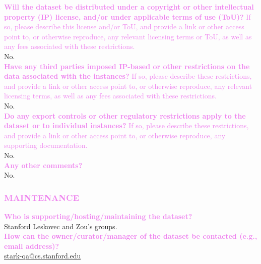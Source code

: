\documentclass{article}
\newcommand{\sectioncolor}{Violet}
\begin{document}
    \textcolor{\sectioncolor}{\textbf{
    Will the dataset be distributed under a copyright or other intellectual
    property (IP) license, and/or under applicable terms of use (ToU)?
    }
    If so, please describe this license and/or ToU, and provide a link or other
    access point to, or otherwise reproduce, any relevant licensing terms or
    ToU, as well as any fees associated with these restrictions.
    } \\
    No. \\

    \textcolor{\sectioncolor}{\textbf{
    Have any third parties imposed IP-based or other restrictions on the data
    associated with the instances?
    }
    If so, please describe these restrictions, and provide a link or other
    access point to, or otherwise reproduce, any relevant licensing terms, as
    well as any fees associated with these restrictions.
    } \\
    No.\\

    \textcolor{\sectioncolor}{\textbf{
    Do any export controls or other regulatory restrictions apply to the
    dataset or to individual instances?
    }
    If so, please describe these restrictions, and provide a link or other
    access point to, or otherwise reproduce, any supporting documentation.
    } \\
    No. \\

    \textcolor{\sectioncolor}{\textbf{
    Any other comments?
    }} \\
    No. \\

\begin{mdframed}[linecolor=\sectioncolor]
\subsubsection*{\textcolor{\sectioncolor}{
    MAINTENANCE
}}
\end{mdframed}

    \textcolor{\sectioncolor}{\textbf{
    Who is supporting/hosting/maintaining the dataset?
    }
    } \\
    Stanford Leskovec and Zou's groups. \\

    \textcolor{\sectioncolor}{\textbf{
    How can the owner/curator/manager of the dataset be contacted (e.g., email
    address)?
    }
    } \\
    \href{stark-qa@cs.stanford.edu}{stark-qa@cs.stanford.edu} \\
\end{document}
